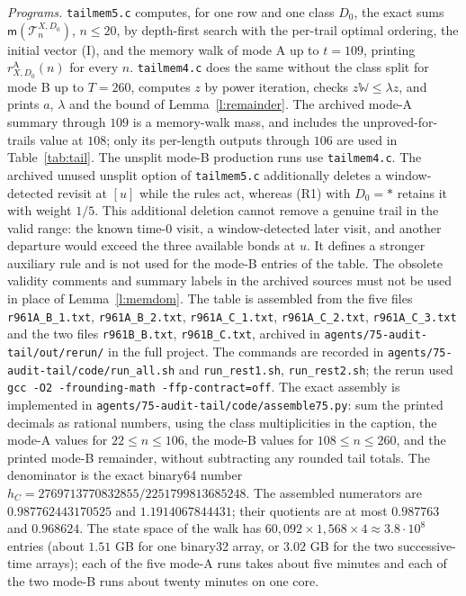 \emph{Programs.} \texttt{tailmem5.c} computes, for one row and one class $D_0$, the exact sums $\mathsf m(\mathcal T^{X, D_0}_n)$, $n \le 20$, by depth-first search with the per-trail optimal ordering, the initial vector (I), and the memory walk of mode A up to $t = 109$, printing $r^{\mathrm A}_{X, D_0}(n)$ for every $n$. \texttt{tailmem4.c} does the same without the class split for mode B up to $T = 260$, computes $z$ by power iteration, checks $z \mathbb W \le \lambda z$, and prints $a$, $\lambda$ and the bound of Lemma~\ref{l:remainder}.
The archived mode-A summary through $109$ is a memory-walk mass, and includes the unproved-for-trails value at $108$; only its per-length outputs through $106$ are used in Table~\ref{tab:tail}.
The unsplit mode-B production runs use \texttt{tailmem4.c}.
The archived unused unsplit option of \texttt{tailmem5.c} additionally deletes a window-detected revisit at $[u]$ while the rules act, whereas (R1) with $D_0=\ast$ retains it with weight $1/5$.
This additional deletion cannot remove a genuine trail in the valid range: the known time-$0$ visit, a window-detected later visit, and another departure would exceed the three available bonds at $u$.
It defines a stronger auxiliary rule and is not used for the mode-B entries of the table.
The obsolete validity comments and summary labels in the archived sources must not be used in place of Lemma~\ref{l:memdom}. The table is assembled from the five files
\texttt{r961A\_B\_1.txt}, \texttt{r961A\_B\_2.txt},
\texttt{r961A\_C\_1.txt}, \texttt{r961A\_C\_2.txt},
\texttt{r961A\_C\_3.txt} and the two files
\texttt{r961B\_B.txt}, \texttt{r961B\_C.txt}, archived in
\texttt{agents/75-audit-tail/out/rerun/} in the full project.
The commands are recorded in \texttt{agents/75-audit-tail/code/run\_all.sh}
and \texttt{run\_rest1.sh}, \texttt{run\_rest2.sh}; the rerun used
\texttt{gcc -O2 -frounding-math -ffp-contract=off}.
The exact assembly is implemented in \texttt{agents/75-audit-tail/code/assemble75.py}:
sum the printed decimals as rational numbers, using the class multiplicities in the caption,
the mode-A values for $22\le n\le106$, the mode-B values for $108\le n\le260$,
and the printed mode-B remainder, without subtracting any rounded tail totals.
The denominator is the exact binary64 number $h_C=2769713770832855/2251799813685248$.
The assembled numerators are $0.987762443170525$ and $1.1914067844431$;
their quotients are at most $0.987763$ and $0.968624$. The state space of the walk has $60{,}092 \times 1{,}568 \times 4 \approx 3.8 \cdot 10^8$ entries (about $1.51$ GB for one binary32 array, or $3.02$ GB for the two successive-time arrays); each of the five mode-A runs takes about five minutes and each of the two mode-B runs about twenty minutes on one core.


